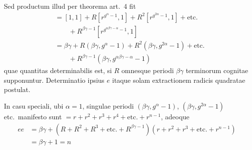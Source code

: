 Sed productum illud per theorema art.\ 4 fit
\[
\begin{aligned}
&{}=[1,1]+R[r^{g^\alpha-1},1]+R^2[r^{g^{2\alpha}-1},1]+\text{etc.}\\
&\qquad{}+R^{\beta\gamma-1}[r^{g^{\alpha\beta\gamma-\alpha}-1},1]\\
&{}=\beta\gamma+R(\beta\gamma,g^\alpha-1)+R^2(\beta\gamma,g^{2\alpha}-1)+\text{etc.}\\
&\qquad{}+R^{\beta\gamma-1}(\beta\gamma,g^{\alpha\beta\gamma-\alpha}-1)
\end{aligned}
\]
quae quantitas determinabilis est, si $R$ omnesque periodi $\beta\gamma$ terminorum cognitae supponuntur. Determinatio ipsius $e$ itaque solam extractionem radicis quadratae postulat.

In casu speciali, ubi $\alpha=1$, singulae periodi $(\beta\gamma,g^\alpha-1)$, $(\beta\gamma,g^{2\alpha}-1)$ etc.\ manifesto sunt $=r+r^2+r^3+r^4+\text{etc.}+r^{n-1}$, adeoque
\[
\begin{aligned}
ee&=\beta\gamma+(R+R^2+R^3+\text{etc.}+R^{\beta\gamma-1})(r+r^2+r^3+\text{etc.}+r^{n-1})\\
&=\beta\gamma+1=n
\end{aligned}
\]
